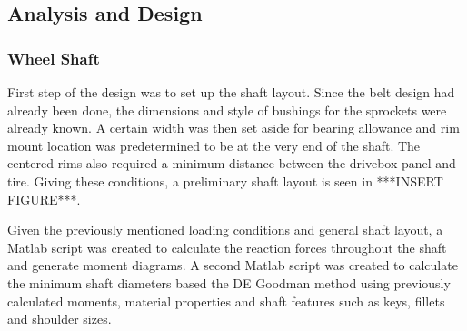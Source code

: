\subsection{Analysis and Design}
\subsubsection{Wheel Shaft}
First step of the design was to set up the shaft layout. Since the belt design had already been done, the dimensions and style of bushings for the sprockets were already known. A certain width was then set aside for bearing allowance and rim mount location was predetermined to be at the very end of the shaft. The centered rims also required a minimum distance between the drivebox panel and tire. Giving these conditions, a preliminary shaft layout is seen in ***INSERT FIGURE***.

Given the previously mentioned loading conditions and general shaft layout, a Matlab script was created to calculate the reaction forces throughout the shaft and generate moment diagrams. A second Matlab script was created to calculate the minimum shaft diameters based the DE Goodman method using previously calculated moments, material properties and shaft features such as keys, fillets and shoulder sizes.

